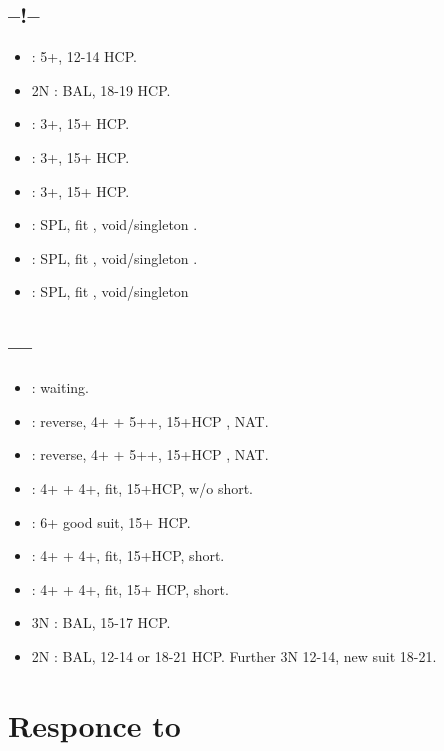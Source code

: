 \documentclass[12pt,twoside,a5paper]{report}%
\begin{document}
	\section*{--!--}
	
		\begin{itemize}
		\renewcommand{\labelitemi}{}
		\item {} : 5+\di{}, 12-14 HCP.
		\item 2N : BAL, 18-19 HCP.
		\item {} : 3+\he{}, 15+ HCP.
		\item {} : 3+\sp{}, 15+ HCP.
		\item {} : 3+\cl{}, 15+ HCP.
		\item {} : SPL, fit \di{}, void/singleton \he{}.
		\item {} : SPL, fit \di{}, void/singleton \sp{}.
		\item {} : SPL, fit \di{}, void/singleton \cl{}
		\end{itemize}

	\section*{----}
		\begin{itemize}
		\renewcommand{\labelitemi}{}
		\item {} : waiting.
		\item {} : reverse, 4+\he{} + 5+\di{}+, 15+HCP , NAT.
		\item {} : reverse, 4+\sp{} + 5+\di{}+, 15+HCP , NAT.
		\item {} :  4+\di{} + 4+\cl{}, fit, 15+HCP, w/o short.
		\item {} : 6+\di{} good suit, 15+ HCP.
		\item {} : 4+\di{} + 4+\cl{}, fit, 15+HCP, short\he{}.
		\item {} : 4+\di{} + 4+\cl{}, fit, 15+ HCP, short\sp{}.
		\item 3N : BAL, 15-17 HCP.
		\item 2N : BAL, 12-14 or 18-21 HCP. Further 3N 12-14, new suit 18-21.
		\end{itemize}

\chapter*{Responce to }
	
\end{document}
